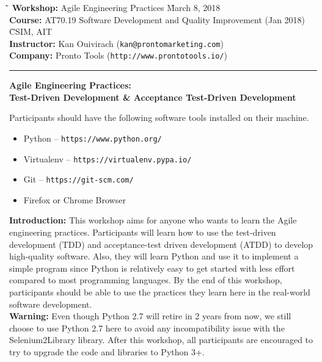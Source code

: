 \documentclass{article}
\begin{document}
\begin{tabbing}
  \`\=\kill
  \textbf{Workshop:} Agile Engineering Practices
  \` March 8, 2018 \\
  \textbf{Course:} AT70.19 Software Development and Quality Improvement (Jan
  2018) \` CSIM, AIT \\
  \textbf{Instructor:} Kan Ouivirach ({\tt \small kan@prontomarketing.com}) \\
  \textbf{Company:} Pronto Tools ({\tt \small http://www.prontotools.io/})
\end{tabbing}

\hrule

\vspace{.25in}

\begin{center}
  \textbf{\Large Agile Engineering Practices:} \\
  \vspace{.1in}
  \textbf{\large Test-Driven Development \& Acceptance Test-Driven Development}
\end{center}

\vspace{.15in}

 Participants should have the following software
tools installed on their machine.

\begin{itemize}
  \item Python -- {\tt https://www.python.org/}
  \item Virtualenv -- {\tt https://virtualenv.pypa.io/}
  \item Git -- {\tt https://git-scm.com/}
  \item Firefox or Chrome Browser
\end{itemize}

\noindent \textbf{Introduction:} This workshop aims for anyone who wants to
learn the Agile engineering practices. Participants will learn how to use the
test-driven development (TDD) and acceptance-test driven development (ATDD) to
develop high-quality software. Also, they will learn Python and use it to
implement a simple program since Python is relatively easy to get started with
less effort compared to most programming languages. By the end of this
workshop, participants should be able to use the practices they learn here in
the real-world software development. \\

\noindent \textbf{Warning:} Even though Python 2.7 will retire in 2 years from
now, we still choose to use Python 2.7 here to avoid any incompatibility issue
with the Selenium2Library library. After this workshop, all participants are
encouraged to try to upgrade the code and libraries to Python 3+.
\end{document}
